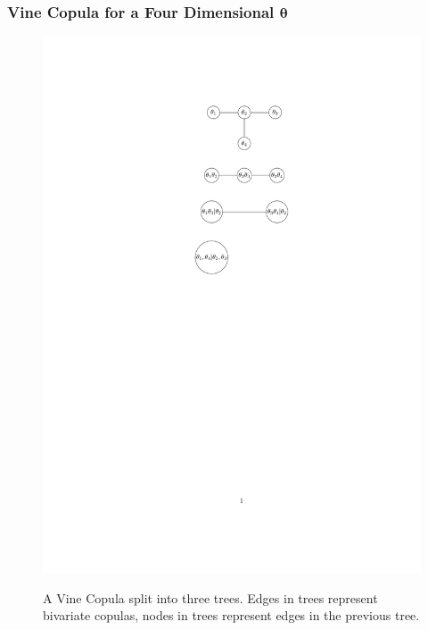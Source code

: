 \documentclass{beamer}\usepackage[]{graphicx}\usepackage[]{color}
\begin{document}
\begin{frame}
\frametitle{Vine Copula for a Four Dimensional $\boldsymbol{\theta}$}
\begin{figure}[h]
\centering
\includegraphics[scale = 0.4]{vines}
\label{fig:vines}
\caption{A Vine Copula split into three trees. Edges in trees represent bivariate copulas, nodes in trees represent edges in the previous tree.}
\end{figure}
\end{frame}
\end{document}
